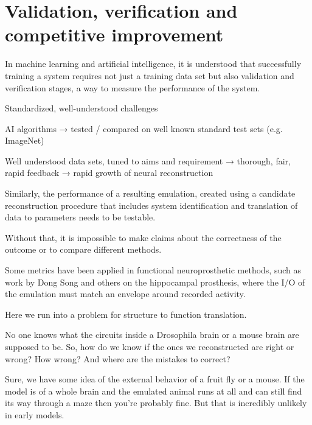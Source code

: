\documentclass{ldr-article}
\begin{document}

\section{Validation, verification and competitive improvement}

In machine learning and artificial intelligence, it is understood that successfully training a system requires not just a training data set but also validation and verification stages, a way to measure the performance of the system.

Standardized, well-understood challenges

AI algorithms → tested / compared on well known standard test sets (e.g. ImageNet)

Well understood data sets, tuned to aims and requirement → thorough, fair, rapid feedback → rapid growth of neural reconstruction



Similarly, the performance of a resulting emulation, created using a candidate reconstruction procedure that includes system identification and translation of data to parameters needs to be testable.

Without that, it is impossible to make claims about the correctness of the outcome or to compare different methods.

Some metrics have been applied in functional neuroprosthetic methods, such as work by Dong Song and others on the hippocampal prosthesis, where the I/O of the emulation must match an envelope around recorded activity.

Here we run into a problem for structure to function translation.

No one knows what the circuits inside a Drosophila brain or a mouse brain are supposed to be. So, how do we know if the ones we reconstructed are right or wrong? How wrong? And where are the mistakes to correct?

Sure, we have some idea of the external behavior of a fruit fly or a mouse. If the model is of a whole brain and the emulated animal runs at all and can still find its way through a maze then you’re probably fine. But that is incredibly unlikely in early models.
\end{document}
